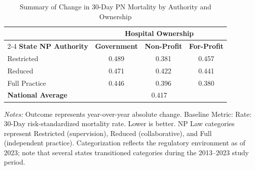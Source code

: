 \begin{table}[htbp]
    \centering
    \caption{Summary of Change in 30-Day PN Mortality by Authority and Ownership}
    \label{tab:d_mortality_rate_pn}
    \vspace{0.2cm}
    \begin{tabular}{lccc}
        \toprule
        & \multicolumn{3}{c}{\textbf{Hospital Ownership}} \\
        \cmidrule(lr){2-4}
        \textbf{State NP Authority} & \textbf{Government} & \textbf{Non-Profit} & \textbf{For-Profit} \\
        \midrule
        Restricted & 0.489 & 0.381 & 0.457 \\
        Reduced & 0.471 & 0.422 & 0.441 \\
        Full Practice & 0.446 & 0.396 & 0.380 \\
        \midrule
        \textbf{National Average} & \multicolumn{3}{c}{0.417} \\
        \bottomrule
    \end{tabular}
    \vspace{0.1cm}
    \begin{minipage}{0.85\textwidth}
        \footnotesize \textit{Notes:} Outcome represents year-over-year absolute change. Baseline Metric: Rate: 30-Day risk-standardized mortality rate. Lower is better. NP Law categories represent Restricted (supervision), Reduced (collaborative), and Full (independent practice). Categorization reflects the regulatory environment as of 2023; note that several states transitioned categories during the 2013--2023 study period.
    \end{minipage}
\end{table}